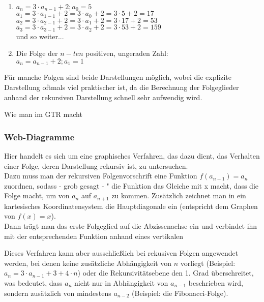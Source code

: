 \begin{Beispiel}
\begin{enumerate}
\item  $a_{n}=3\cdot a_{n-1}+2;a_{0}=5$\\
\indent$a_{1}=3\cdot a_{1-1}+2=3\cdot a_{0}+2=3\cdot5+2=17$\\
\indent$a_{2}=3\cdot a_{2-1}+2=3\cdot a_{1}+2=3\cdot17+2=53$\\
\indent$a_{3}=3\cdot a_{3-1}+2=3\cdot a_{2}+2=3\cdot53+2=159$\\
\indent und so weiter...
\item Die Folge der $n-ten$ positiven, ungeraden Zahl:\\
$a_{n}=a_{n-1}+2;a_{1}=1$
\end{enumerate}
\end{Beispiel}

\begin{Bemerkung}
Für manche Folgen sind beide Darstellungen möglich, wobei die explizite Darstellung oftmals viel praktischer ist, da die Berechnung der Folgeglieder anhand der rekursiven Darstellung schnell sehr aufwendig wird.
\end{Bemerkung}

\begin{GTR-Tipp}
Wie man im GTR macht
\end{GTR-Tipp}

\subsubsection{Web-Diagramme}
Hier handelt es sich um eine graphisches Verfahren, das dazu dient, das Verhalten einer Folge, deren Darstellung rekursiv ist, zu untersuchen.\\
Dazu muss man der rekursiven Folgenvorschrift eine Funktion $f(a_{n-1})=a_{n}$ zuordnen, sodass - grob gesagt - " die Funktion das Gleiche mit x macht, dass die Folge macht, um von $a_{n}$ auf $a_{n+1}$ zu kommen. Zusätzlich zeichnet man in ein kartesisches Koordinatensystem die Hauptdiagonale ein (entspricht dem Graphen von $f(x)=x$).\\
Dann trägt man das erste Folgeglied auf die Abzissenachse ein und verbindet ihn mit der entsprechenden Funktion anhand eines vertikalen\\

\begin{Bemerkung}
Dieses Verfahren kann aber ausschließlich bei rekusiven Folgen angewendet werden, bei denen keine zusätzliche Abhängigkeit von $n$ vorliegt (Beispiel: $a_{n}=3\cdot a_{n-1}+3+4\cdot n$) oder die Rekursivitätsebene den 1. Grad überschreitet, was bedeutet, dass $a_{n}$ nicht nur in Abhängigkeit von $a_{n-1}$ beschrieben wird, sondern zusätzlich von mindestens $a_{n-2}$ (Beispiel: die Fibonacci-Folge).\\
\end{Bemerkung}

